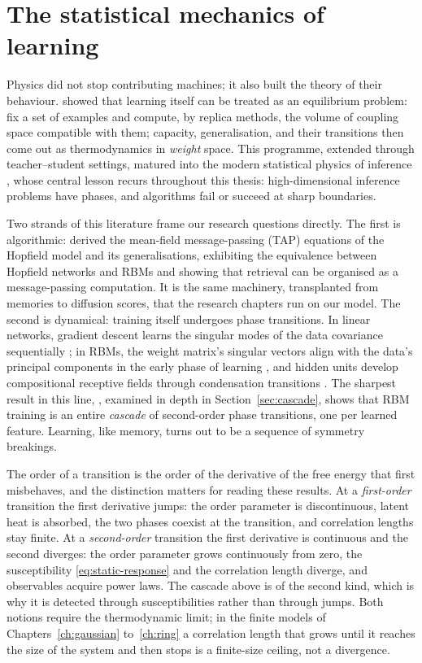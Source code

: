 \section{The statistical mechanics of learning}\label{sec:statmech-learning}

Physics did not stop contributing machines; it also built the theory of
their behaviour. \citet{gardner1988space} showed that learning itself can
be treated as an equilibrium problem: fix a set of examples and compute,
by replica methods, the volume of coupling space compatible with them;
capacity, generalisation, and their transitions then come out as
thermodynamics in \emph{weight} space. This programme, extended through
teacher--student settings, matured into the modern statistical physics of
inference \citep{zdeborova2016statistical}, whose central lesson recurs
throughout this thesis: high-dimensional inference problems have phases,
and algorithms fail or succeed at sharp boundaries.

Two strands of this literature frame our research questions directly.
The first is algorithmic: \citet{mezard2017meanfield} derived the
mean-field message-passing (TAP) equations of the Hopfield model and its
generalisations, exhibiting the equivalence between Hopfield networks and
RBMs and showing that retrieval can be organised as a message-passing
computation. It is the same machinery, transplanted from memories to
diffusion scores, that the research chapters run on our model. The second
is dynamical: training itself undergoes phase transitions. In linear
networks, gradient descent learns the singular modes of the data
covariance sequentially \citep{saxe2014exact}; in RBMs, the weight
matrix's singular vectors align with the data's principal components in
the early phase of learning \citep{decelle2017spectral}, and hidden units
develop compositional receptive fields through condensation transitions
\citep{tubiana2017emergence}. The sharpest result in this line,
\citet{bachtis2024cascade}, examined in depth in
Section~\ref{sec:cascade}, shows that RBM training is an entire
\emph{cascade} of second-order phase transitions, one per learned
feature. Learning, like memory, turns out to be a sequence of symmetry
breakings.

The order of a transition is the order of the derivative of the free energy
that first misbehaves, and the distinction matters for reading these results.
At a \emph{first-order} transition the first derivative jumps: the order
parameter is discontinuous, latent heat is absorbed, the two phases coexist at
the transition, and correlation lengths stay finite. At a \emph{second-order}
transition the first derivative is continuous and the second diverges: the
order parameter grows continuously from zero, the susceptibility
\eqref{eq:static-response} and the correlation length diverge, and observables
acquire power laws. The cascade above is of the second kind, which is why it is
detected through susceptibilities rather than through jumps. Both notions
require the thermodynamic limit; in the finite models of
Chapters~\ref{ch:gaussian} to~\ref{ch:ring} a correlation length that grows
until it reaches the size of the system and then stops is a finite-size
ceiling, not a divergence.

